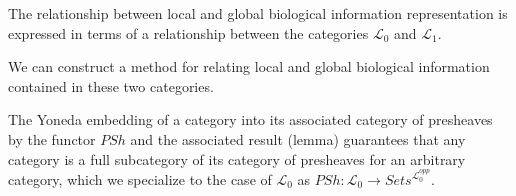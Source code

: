 \begin{frame}
\begin{block}{}
The relationship between local and global biological information representation is expressed in terms of a relationship between the categories $\mathcal{L}_0$ and $\mathcal{L}_1$. 
\end{block}
\begin{block}{}
We can construct a method for relating local and global biological information contained in these two categories.
\end{block}
\begin{block}{}
The Yoneda embedding of a category into its associated category of presheaves by the functor $PSh$ and the associated result (lemma) guarantees that any category is a full subcategory of its category of presheaves for an arbitrary category, which we specialize to the case of $\mathcal{L}_0$ as $PSh: \mathcal{L}_0 \rightarrow \textit{Sets}^{\mathcal{L}_0^{opp}}$.
\end{block}
\end{frame}